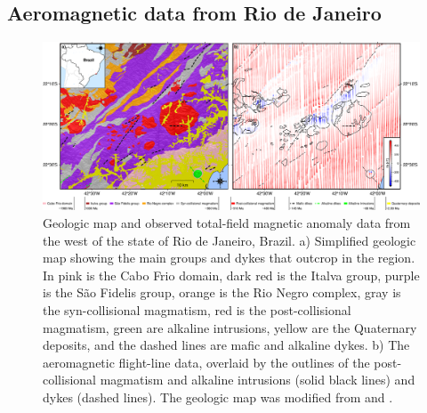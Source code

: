 \subsection{Aeromagnetic data from Rio de Janeiro}
\label{sec:rio}

\begin{figure}[tb!]
\centering
\includegraphics[width=1\linewidth]{euler-inversion/figures/real-data-geology.png}
\caption{
  Geologic map and observed total-field magnetic anomaly data from the west of
  the state of Rio de Janeiro, Brazil.
  a) Simplified geologic map showing the main groups and dykes that outcrop in
  the region.
  In pink is the Cabo Frio domain, dark red is the Italva group, purple is the
  São Fidelis group, orange is the Rio Negro complex, gray is the
  syn-collisional magmatism, red is the post-collisional magmatism, green are
  alkaline intrusions, yellow are the Quaternary deposits, and the dashed lines
  are mafic and alkaline dykes.
  b) The aeromagnetic flight-line data, overlaid by the outlines of the
  post-collisional magmatism and alkaline intrusions (solid black lines) and
  dykes (dashed lines).
  The geologic map was modified from \citet{Heilbron2016} and
  \citet{Dantas2017}.
}
\label{fig:rio_context}
\end{figure}

